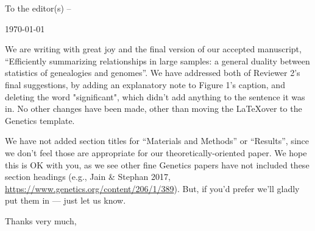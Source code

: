 \documentclass[12pt,letterpaper]{article}
\begin{document}
\pagestyle{plain}

\noindent 
  

\opening{To the editor(s) --}
\today

We are writing with great joy and the final version of our accepted manuscript,
``Efficiently summarizing relationships in large samples: a general duality between statistics of genealogies and genomes''.
We have addressed both of Reviewer 2's final suggestions,
by adding an explanatory note to Figure 1's caption, and deleting the word "significant",
which didn't add anything to the sentence it was in.
No other changes have been made,
other than moving the \LaTeX over to the Genetics template.

We have not added section titles for ``Materials and Methods'' or ``Results'',
since we don't feel those are appropriate for our theoretically-oriented paper.
We hope this is OK with you,
as we see other fine Genetics papers have not included these section headings
(e.g., Jain \& Stephan 2017, \url{https://www.genetics.org/content/206/1/389}).
But, if you'd prefer we'll gladly put them in --- just let us know.

\closing{Thanks very much,}
\end{document}

